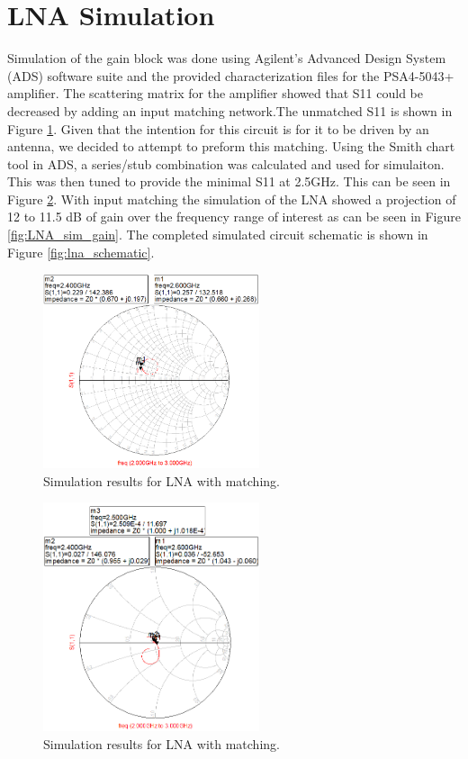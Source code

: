 \documentclass[conference]{IEEEtran}
\begin{document}
\section{LNA Simulation}
Simulation of the gain block was done using Agilent's Advanced Design System (ADS) software suite and the provided characterization files for the PSA4-5043+ amplifier. The scattering matrix for the amplifier showed that S11 could be decreased by adding an input matching network.The unmatched S11 is shown in Figure \ref{fig:LNA_Smith_unmatched}. Given that the intention for this circuit is for it to be driven by an antenna, we decided to attempt to preform this matching. Using the Smith chart tool in ADS, a series/stub combination was calculated and used for simulaiton. This was then tuned to provide the minimal S11 at 2.5GHz. This can be seen in Figure \ref{fig:LNA_Smith_matched}.  With input matching the simulation of the LNA showed a projection of 12 to 11.5 dB of gain over the frequency range of interest as can be seen in Figure \ref{fig:LNA_sim_gain}. The completed simulated circuit schematic is shown in Figure \ref{fig:lna_schematic}.

\begin{figure}[!h]
\centering
\includegraphics[width=2.5in]{amplifier_simulation_pics/MMIC_unmatched_circuit-with-transmission-lines.PNG}
\caption{Simulation results for LNA with matching.}
\label{fig:LNA_Smith_unmatched}
\end{figure}

\begin{figure}[!h]
\centering
\includegraphics[width=2.5in]{amplifier_simulation_pics/MMIC_matched_circuit-with-transmission-lines.PNG}
\caption{Simulation results for LNA with matching.}
\label{fig:LNA_Smith_matched}
\end{figure}
\end{document}
